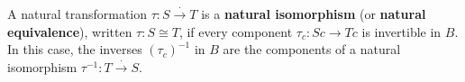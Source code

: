 A natural transformation $\tau: S \xrightarrow{\cdot} T$ is a \textbf{natural isomorphism} (or \textbf{natural equivalence}), written $\tau: S \cong T$, if every component $\tau_c: Sc \rightarrow Tc$ is invertible in $B$. In this case, the inverses $(\tau_c)^{-1}$ in $B$ are the components of a natural isomorphism $\tau^{-1}: T \xrightarrow{\cdot} S$.